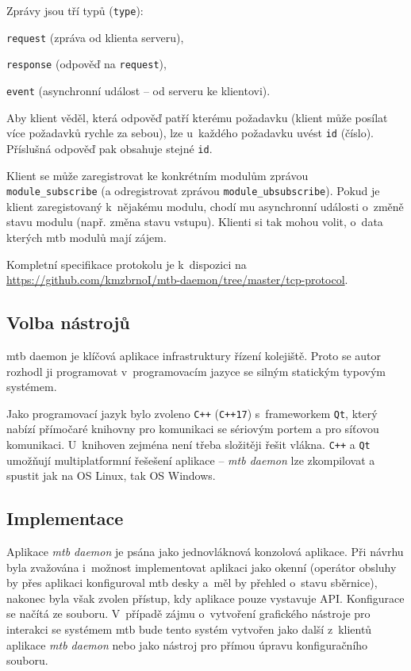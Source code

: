 Zprávy jsou tří typů (\texttt{type}):

\begin{compactenum}
\item \texttt{request} (zpráva od klienta serveru),
\item \texttt{response} (odpověď na \texttt{request}),
\item \texttt{event} (asynchronní událost – od serveru ke klientovi).
\end{compactenum}

Aby klient věděl, která odpověď patří kterému požadavku (klient může posílat
více požadavků rychle za sebou), lze u~každého požadavku uvést \texttt{id}
(číslo). Příslušná odpověď pak obsahuje stejné \texttt{id}.

Klient se může zaregistrovat ke konkrétním modulům zprávou \\
\texttt{module\_subscribe} (a odregistrovat zprávou
\texttt{module\_ubsubscribe}). Pokud je klient zaregistovaný k~nějakému modulu,
chodí mu asynchronní události o~změně stavu modulu (např. změna stavu vstupu).
Klienti si tak mohou volit, o~data kterých \gls{mtb} modulů mají zájem.

Kompletní specifikace protokolu je k~dispozici na
\url{https://github.com/kmzbrnoI/mtb-daemon/tree/master/tcp-protocol}.

\subsection{Volba nástrojů} \label{sec:daemon:tools}

\gls{mtb} daemon je klíčová aplikace infrastruktury řízení kolejiště. Proto se
autor rozhodl ji programovat v~programovacím jazyce se silným statickým typovým
systémem.

Jako programovací jazyk bylo zvoleno \texttt{C++} (\texttt{C++17})
s~frameworkem \texttt{Qt}, který nabízí přímočaré knihovny pro komunikaci se
sériovým portem a pro síťovou komunikaci. U~knihoven zejména není třeba
složitěji řešit vlákna. \texttt{C++} a \texttt{Qt} umožňují multiplatformní
řešešení aplikace – \textit{\gls{mtb} daemon} lze zkompilovat a spustit jak na
OS Linux, tak OS Windows.

\subsection{Implementace} \label{sec:daemon:impl}

Aplikace \textit{\gls{mtb} daemon} je psána jako jednovláknová konzolová aplikace.
Při návrhu byla zvažována i~možnost implementovat aplikaci jako okenní
(operátor obsluhy by přes aplikaci konfiguroval \gls{mtb} desky a~měl by
přehled o~stavu sběrnice), nakonec byla však zvolen přístup, kdy aplikace pouze
vystavuje API. Konfigurace se načítá ze souboru. V~případě zájmu o~vytvoření
grafického nástroje pro interakci se systémem \gls{mtb} bude tento systém
vytvořen jako další z~klientů aplikace \textit{\gls{mtb} daemon} nebo jako
nástroj pro přímou úpravu konfiguračního souboru.

